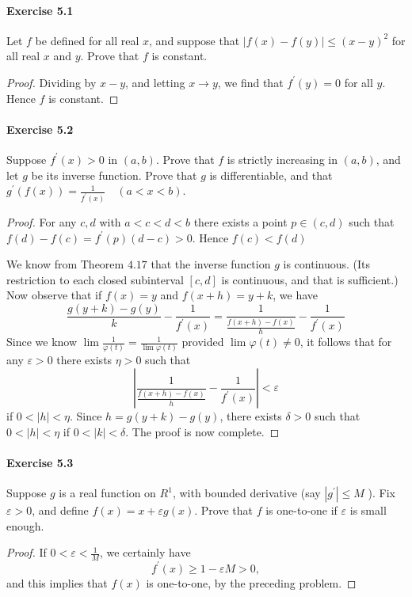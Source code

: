 \documentclass{article}
\theoremstyle{definition}
\begin{document}
\paragraph{Exercise 5.1} Let $f$ be defined for all real $x$, and suppose that $|f(x)-f(y)| \leq (x-y)^{2}$ for all real $x$ and $y$. Prove that $f$ is constant.
\begin{proof}
    Dividing by $x-y$, and letting $x \rightarrow y$, we find that $f^{\prime}(y)=0$ for all $y$. Hence $f$ is constant.
\end{proof}


\paragraph{Exercise 5.2} Suppose $f^{\prime}(x)>0$ in $(a, b)$. Prove that $f$ is strictly increasing in $(a, b)$, and let $g$ be its inverse function. Prove that $g$ is differentiable, and that $g^{\prime}(f(x))=\frac{1}{f^{\prime}(x)} \quad(a<x<b)$.
\begin{proof}
   For any $c, d$ with $a<c<d<b$ there exists a point $p \in(c, d)$ such that $f(d)-f(c)=f^{\prime}(p)(d-c)>0$. Hence $f(c)<f(d)$

We know from Theorem $4.17$ that the inverse function $g$ is continuous. (Its restriction to each closed subinterval $[c, d]$ is continuous, and that is sufficient.) Now observe that if $f(x)=y$ and $f(x+h)=y+k$, we have
$$
\frac{g(y+k)-g(y)}{k}-\frac{1}{f^{\prime}(x)}=\frac{1}{\frac{f(x+h)-f(x)}{h}}-\frac{1}{f^{\prime}(x)}
$$
Since we know $\lim \frac{1}{\varphi(t)}=\frac{1}{\lim \varphi(t)}$ provided $\lim \varphi(t) \neq 0$, it follows that for any $\varepsilon>0$ there exists $\eta>0$ such that
$$
\left|\frac{1}{\frac{f(x+h)-f(x)}{h}}-\frac{1}{f^{\prime}(x)}\right|<\varepsilon
$$
if $0<|h|<\eta$. Since $h=g(y+k)-g(y)$, there exists $\delta>0$ such that $0<|h|<\eta$ if $0<|k|<\delta$. The proof is now complete. 
\end{proof}


\paragraph{Exercise 5.3} Suppose $g$ is a real function on $R^{1}$, with bounded derivative (say $\left|g^{\prime}\right| \leq M$ ). Fix $\varepsilon>0$, and define $f(x)=x+\varepsilon g(x)$. Prove that $f$ is one-to-one if $\varepsilon$ is small enough.
\begin{proof}
    If $0<\varepsilon<\frac{1}{M}$, we certainly have
$$
f^{\prime}(x) \geq 1-\varepsilon M>0,
$$
and this implies that $f(x)$ is one-to-one, by the preceding problem.
\end{proof}
\end{document}

